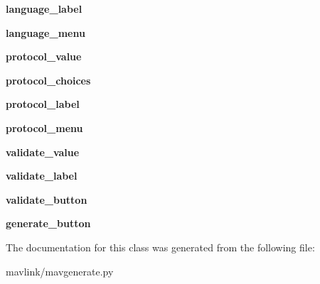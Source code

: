 \begin{DoxyCompactItemize}
\item 
\mbox{\label{classmavgenerate_1_1Application_afc688be6fb7bcdb0f85568ca387cada3}} 
{\bfseries language\+\_\+label}
\item 
\mbox{\label{classmavgenerate_1_1Application_aa1666917bbb914fe2714c9a79ece08cc}} 
{\bfseries language\+\_\+menu}
\item 
\mbox{\label{classmavgenerate_1_1Application_ac7e2e3fc39aec353cd15e63ff0f76796}} 
{\bfseries protocol\+\_\+value}
\item 
\mbox{\label{classmavgenerate_1_1Application_a9ff45786bc967e1ddf61447e62405749}} 
{\bfseries protocol\+\_\+choices}
\item 
\mbox{\label{classmavgenerate_1_1Application_a83f55652f56719cbc5e84e8dbb746911}} 
{\bfseries protocol\+\_\+label}
\item 
\mbox{\label{classmavgenerate_1_1Application_ab005c01e04b1c06d96ea7fe16b1685aa}} 
{\bfseries protocol\+\_\+menu}
\item 
\mbox{\label{classmavgenerate_1_1Application_a06f96dccc9bc41156675a85413d71f02}} 
{\bfseries validate\+\_\+value}
\item 
\mbox{\label{classmavgenerate_1_1Application_a51a11015b2e11a6846b03e331b1d751b}} 
{\bfseries validate\+\_\+label}
\item 
\mbox{\label{classmavgenerate_1_1Application_a55227b621af06b0760c80e0987b6fed8}} 
{\bfseries validate\+\_\+button}
\item 
\mbox{\label{classmavgenerate_1_1Application_a14066b479ea2e2a37d3864af10149410}} 
{\bfseries generate\+\_\+button}
\end{DoxyCompactItemize}


The documentation for this class was generated from the following file\+:\begin{DoxyCompactItemize}
\item 
mavlink/mavgenerate.\+py\end{DoxyCompactItemize}
